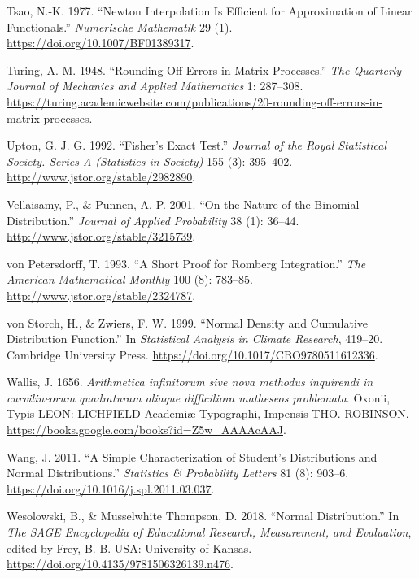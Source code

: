 \documentclass[
]{article}
\newlength{\cslhangindent}
\newlength{\cslentryspacingunit} %
\newenvironment{CSLReferences}[2] %
 {%
  \setlength{\parindent}{0pt}
  \ifodd #1
  \let\oldpar\par
  \def\par{\hangindent=\cslhangindent\oldpar}
  \fi
  \setlength{\parskip}{#2\cslentryspacingunit}
 }%
 {}
\begin{document}
\begin{CSLReferences}{1}{0}
\leavevmode{}%
Tsao, N.-K. 1977. {``Newton Interpolation Is Efficient for Approximation
of Linear Functionals.''} \emph{Numerische Mathematik} 29 (1).
\url{https://doi.org/10.1007/BF01389317}.

\leavevmode{}%
Turing, A. M. 1948. {``Rounding-Off Errors in Matrix Processes.''}
\emph{The Quarterly Journal of Mechanics and Applied Mathematics} 1:
287--308.
\url{https://turing.academicwebsite.com/publications/20-rounding-off-errors-in-matrix-processes}.

\leavevmode{}%
Upton, G. J. G. 1992. {``Fisher's Exact Test.''} \emph{Journal of the
Royal Statistical Society. Series A (Statistics in Society)} 155 (3):
395--402. \url{http://www.jstor.org/stable/2982890}.

\leavevmode{}%
Vellaisamy, P., \& Punnen, A. P. 2001. {``On the Nature of the Binomial
Distribution.''} \emph{Journal of Applied Probability} 38 (1): 36--44.
\url{http://www.jstor.org/stable/3215739}.

\leavevmode{}%
von Petersdorff, T. 1993. {``A Short Proof for Romberg Integration.''}
\emph{The American Mathematical Monthly} 100 (8): 783--85.
\url{http://www.jstor.org/stable/2324787}.

\leavevmode{}%
von Storch, H., \& Zwiers, F. W. 1999. {``Normal Density and Cumulative
Distribution Function.''} In \emph{Statistical Analysis in Climate
Research}, 419--20. Cambridge University Press.
\url{https://doi.org/10.1017/CBO9780511612336}.

\leavevmode{}%
Wallis, J. 1656. \emph{{Arithmetica infinitorum sive nova methodus
inquirendi in curvilineorum quadraturam aliaque difficiliora matheseos
problemata}}. {Oxonii, Typis LEON: LICHFIELD Academiæ Typographi,
Impensis THO. ROBINSON}.
\url{https://books.google.com/books?id=Z5w_AAAAcAAJ}.

\leavevmode{}%
Wang, J. 2011. {``A Simple Characterization of Student's Distributions
and Normal Distributions.''} \emph{Statistics \& Probability Letters} 81
(8): 903--6. \url{https://doi.org/10.1016/j.spl.2011.03.037}.

\leavevmode{}%
Wesolowski, B., \& Musselwhite Thompson, D. 2018. {``Normal
Distribution.''} In \emph{The SAGE Encyclopedia of Educational Research,
Measurement, and Evaluation}, edited by Frey, B. B. USA: University of
Kansas. \url{https://doi.org/10.4135/9781506326139.n476}.


\end{CSLReferences}
\end{document}
